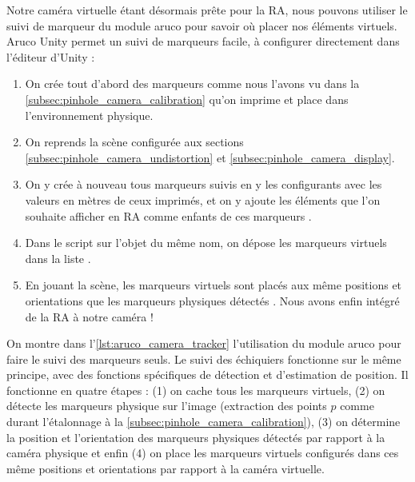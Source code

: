 Notre caméra virtuelle étant désormais prête pour la RA, nous pouvons utiliser le suivi de marqueur du module aruco pour savoir où placer nos éléments virtuels. Aruco Unity permet un suivi de marqueurs facile, à configurer directement dans l'éditeur d'Unity :
\begin{enumerate}
  \item On crée tout d'abord des marqueurs comme nous l'avons vu dans la \autoref{subsec:pinhole_camera_calibration} qu'on imprime et place dans l'environnement physique.
  \item On reprends la scène configurée aux sections \ref{subsec:pinhole_camera_undistortion} et \ref{subsec:pinhole_camera_display}.
  \item On y crée à nouveau tous marqueurs suivis en y les configurants avec les valeurs en mètres de ceux imprimés, et on y ajoute les éléments que l'on souhaite afficher en RA comme enfants de ces marqueurs .
  \item Dans le script  sur l'objet du même nom, on dépose les marqueurs virtuels dans la liste  .
  \item En jouant la scène, les marqueurs virtuels sont placés aux même positions et orientations que les marqueurs physiques détectés . Nous avons enfin intégré de la RA à notre caméra !
\end{enumerate}


On montre dans l'\autoref{lst:aruco_camera_tracker} l'utilisation du module aruco pour faire le suivi des marqueurs seuls. Le suivi des échiquiers fonctionne sur le même principe, avec des fonctions spécifiques de détection et d'estimation de position. Il fonctionne en quatre étapes : (1) on cache tous les marqueurs virtuels, (2) on détecte les marqueurs physique sur l'image (extraction des points $p$ comme durant l'étalonnage à la \autoref{subsec:pinhole_camera_calibration}), (3) on détermine la position et l'orientation des marqueurs physiques détectés par rapport à la caméra physique et enfin (4) on place les marqueurs virtuels configurés dans ces même positions et orientations par rapport à la caméra virtuelle.

